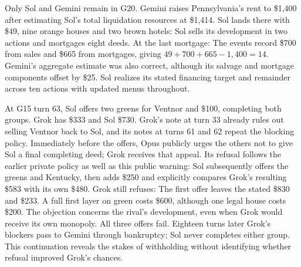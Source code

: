 Only Sol and Gemini remain in G20. Gemini raises Pennsylvania's rent to \$1,400 after estimating Sol's total liquidation resources at \$1,414. Sol lands there with \$49, nine orange houses and two brown hotels:
Sol sells its development in two actions and mortgages eight deeds. At the last mortgage:
The events record \$700 from sales and \$665 from mortgages, giving $49+700+665-1,400=14$. Gemini's aggregate estimate was also correct, although its salvage and mortgage components offset by \$25. Sol realizes its stated financing target and remainder across ten actions with updated menus throughout.


At G15 turn 63, Sol offers two greens for Ventnor and \$100, completing both groups. Grok has \$333 and Sol \$730. Grok's note at turn 33 already rules out selling Ventnor back to Sol, and its notes at turns 61 and 62 repeat the blocking policy. Immediately before the offers, Opus publicly urges the others not to give Sol a final completing deed; Grok receives that appeal. Its refusal follows the earlier private policy as well as this public warning:
Sol subsequently offers the greens and Kentucky, then adds \$250 and explicitly compares Grok's resulting \$583 with its own \$480. Grok still refuses:
The first offer leaves the stated \$830 and \$233. A full first layer on green costs \$600, although one legal house costs \$200. The objection concerns the rival's development, even when Grok would receive its own monopoly. All three offers fail. Eighteen turns later Grok's blockers pass to Gemini through bankruptcy; Sol never completes either group. This continuation reveals the stakes of withholding without identifying whether refusal improved Grok's chances.



